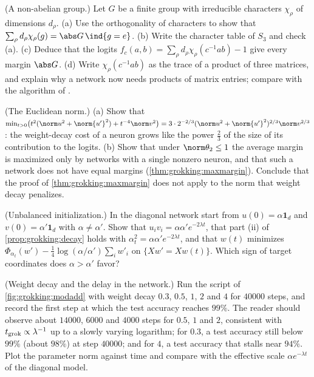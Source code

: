 \begin{refsection}
\begin{exercises}
\item \variation (A non-abelian group.) Let $G$ be a finite group with irreducible characters $\chi_\rho$ of dimensions $d_\rho$. (a) Use the orthogonality of characters to show that $\sum_\rho d_\rho\chi_\rho(g)=\abs G\,\ind\{g=e\}$. (b) Write the character table of $S_3$ and check (a). (c) Deduce that the logits $f_c(a,b)=\sum_\rho d_\rho\chi_\rho(c^{-1}ab)-1$ give every margin $\abs G$. (d) Write $\chi_\rho(c^{-1}ab)$ as the trace of a product of three matrices, and explain why a network now needs products of matrix entries; compare with the algorithm of \textcite{ChughtaiEtAl2023}. \label{ex:grokking:s3}

\item \variation (The Euclidean norm.) (a) Show that $\min_{t>0}\bigl(t^2(\norm u^2+\norm{u'}^2)+t^{-4}\norm v^2\bigr)=3\cdot2^{-2/3}(\norm u^2+\norm{u'}^2)^{2/3}\norm v^{2/3}$: the weight-decay cost of a neuron grows like the power $\frac23$ of the size of its contribution to the logits. (b) Show that under $\norm\theta_2\le1$ the average margin is maximized only by networks with a single nonzero neuron, and that such a network does not have equal margins (\cref{thm:grokking:maxmargin}). Conclude that the proof of \cref{thm:grokking:maxmargin} does not apply to the norm that weight decay penalizes. \label{ex:grokking:l2}

\item \variation (Unbalanced initialization.) In the diagonal network start from $u(0)=\alpha\mathbf1_d$ and $v(0)=\alpha'\mathbf1_d$ with $\alpha\ne\alpha'$. Show that $u_iv_i=\alpha\alpha'e^{-2\lambda t}$, that part (ii) of \cref{prop:grokking:decay} holds with $\alpha_t^2=\alpha\alpha'e^{-2\lambda t}$, and that $w(t)$ minimizes $\Phi_{\alpha_t}(w')-\frac14\log(\alpha/\alpha')\sum_iw'_i$ on $\{Xw'=Xw(t)\}$. Which sign of target coordinates does $\alpha>\alpha'$ favor? \label{ex:grokking:unbalanced}

\item \simulation (Weight decay and the delay in the network.) Run the script of \cref{fig:grokking:modadd} with weight decay $0.3$, $0.5$, $1$, $2$ and $4$ for $40000$ steps, and record the first step at which the test accuracy reaches $99\%$. The reader should observe about $14000$, $6000$ and $4000$ steps for $0.5$, $1$ and $2$, consistent with $t_{\mathrm{grok}}\propto\lambda^{-1}$ up to a slowly varying logarithm; for $0.3$, a test accuracy still below $99\%$ (about $98\%$) at step $40000$; and for $4$, a test accuracy that stalls near $94\%$. Plot the parameter norm against time and compare with the effective scale $\alpha e^{-\lambda t}$ of the diagonal model. \label{ex:grokking:wdsweep}


\end{exercises}
\end{refsection}
